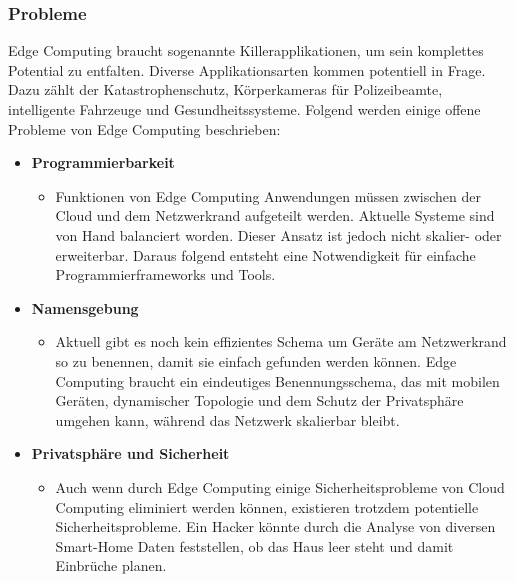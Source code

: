 \documentclass{sigchi}
\begin{document}
\subsubsection{Probleme}
Edge Computing braucht sogenannte Killerapplikationen, um sein komplettes Potential zu entfalten. Diverse Applikationsarten kommen potentiell in Frage. Dazu zählt der Katastrophenschutz, Körperkameras für Polizeibeamte, intelligente Fahrzeuge und Gesundheitssysteme. Folgend werden einige offene Probleme von Edge Computing beschrieben: \cite{promise-edge-computing:2016}

\begin{itemize}
    \item \textbf{Programmierbarkeit}
    \begin{itemize}
        \item Funktionen von Edge Computing Anwendungen müssen zwischen der Cloud und dem Netzwerkrand aufgeteilt werden. Aktuelle Systeme sind von Hand balanciert worden. Dieser Ansatz ist jedoch nicht skalier- oder erweiterbar. Daraus folgend entsteht eine Notwendigkeit für einfache Programmierframeworks und Tools.
    \end{itemize}
    \item \textbf{Namensgebung}
        \begin{itemize}
            \item Aktuell gibt es noch kein effizientes Schema um Geräte am Netzwerkrand so zu benennen, damit sie einfach gefunden werden können. Edge Computing braucht ein eindeutiges Benennungsschema, das mit mobilen Geräten, dynamischer Topologie und dem Schutz der Privatsphäre umgehen kann, während das Netzwerk skalierbar bleibt.
        \end{itemize}
    \item \textbf{Privatsphäre und Sicherheit}
        \begin{itemize}
            \item Auch wenn durch Edge Computing einige Sicherheitsprobleme von Cloud Computing eliminiert werden können, existieren trotzdem potentielle Sicherheitsprobleme. Ein Hacker könnte durch die Analyse von diversen Smart-Home Daten feststellen, ob das Haus leer steht und damit Einbrüche planen.
        \end{itemize}
\end{itemize}
\end{document}
